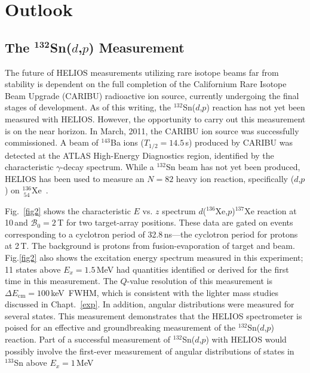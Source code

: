 \section{Outlook}
\subsection[\texorpdfstring{The $^\text{132}$S\lowercase{n($d$,$p$)} Measurement}{The 132Sn(d,p) Measurement}]{\texorpdfstring{The $^\mathbf{132}$Sn($d$,$p$) Measurement}{The 132Sn(d,p) Measurement}}
The future of HELIOS measurements utilizing rare isotope beams far from stability is dependent on the full completion of the Californium Rare Isotope Beam Upgrade (CARIBU) radioactive ion source, currently  undergoing the final stages of development.
As of this writing, the $^{132}$Sn($d$,$p$) reaction has not yet been measured with HELIOS.  However, the opportunity to carry out this measurement is on the near horizon. 
 In March, 2011, the CARIBU ion source was successfully commissioned.  A beam of $^{143}$Ba ions ($T_{1/2}=14.5$\,s) produced by CARIBU was detected at the ATLAS High-Energy Diagnostics region, %
  identified by the characteristic $\gamma$-decay spectrum.  While a $^{132}$Sn beam has not yet been produced, HELIOS has been used to measure an $N=82$ heavy ion reaction, specifically ($d$,$p$) on $^{136}_{~54}$Xe~\cite{Kay_2011}.  

Fig.~\ref{fig2} shows the characteristic $E$ vs. $z$ spectrum $d$($^{136}$Xe,$p$)$^{137}$Xe reaction at 10\,\AMeV and $\mathscr{B}_0=2$\,T for two target-array positions.  These data are gated on events corresponding to a cyclotron period of 32.8\,ns---the cyclotron period for protons at 2\,T. The background is protons from fusion-evaporation of target and beam.  Fig.\ref{fig2} also shows the excitation energy spectrum measured in this experiment; 11 states above $E_x=1.5$\,MeV had quantities identified or derived for the first time in this measurement.  The $Q$-value resolution of this measurement is $\Delta E_\mathrm{cm}=100$\,keV~FWHM, which is consistent with the lighter mass studies discussed in Chapt.~\ref{exp}. 
In addition, angular distributions were measured for several states.  This measurement demonstrates that the HELIOS spectrometer is poised for an effective and groundbreaking measurement of the $^{132}$Sn($d$,$p$) reaction.  Part of a successful measurement of $^{132}$Sn($d$,$p$) with HELIOS would possibly involve the first-ever measurement of angular distributions of states in $^{133}$Sn above $E_x=1$\,MeV
 


